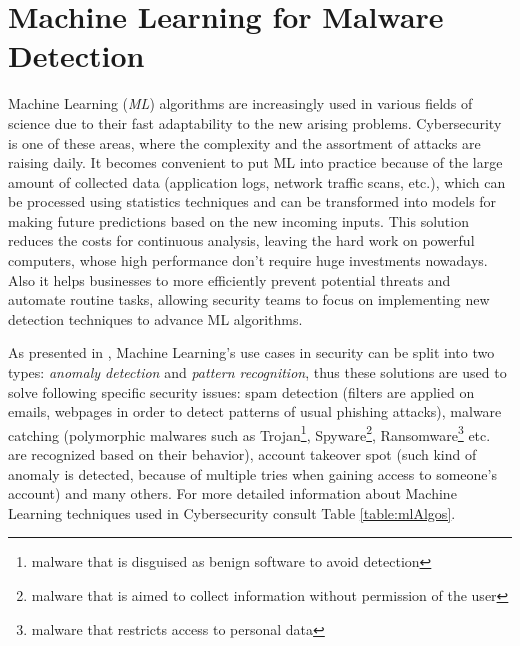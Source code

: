 \section{Machine Learning for Malware Detection}
\label{section:mlForMalware}
Machine Learning (\textit{ML}) algorithms are increasingly used in various fields of science due to their fast adaptability to the new arising problems. Cybersecurity is one of these areas, where the complexity and the assortment of attacks are raising daily. It becomes convenient to put ML into practice because of the large amount of collected data (application logs, network traffic scans, etc.), which can be processed using statistics techniques and can be transformed into models for making future predictions based on the new incoming inputs. This solution reduces the costs for continuous analysis, leaving the hard work on powerful computers, whose high performance don't require huge investments nowadays. Also it helps businesses to more efficiently prevent potential threats and automate routine tasks, allowing security teams to focus on implementing new detection techniques to advance ML algorithms. \par 
As presented in \cite{mlsec}, Machine Learning's use cases in security can be split into two types: \textit{anomaly detection} and \textit{pattern recognition}, thus these solutions are used to solve following specific security issues: spam detection (filters are applied on emails, webpages in order to detect patterns of usual phishing attacks), malware catching (polymorphic malwares such as Trojan\footnote{malware that is disguised as benign software to avoid detection}, Spyware\footnote{malware that is aimed to collect information without permission of the user}, Ransomware\footnote{malware that restricts access to personal data} etc. are recognized based on their behavior), account takeover spot (such kind of anomaly is detected, because of multiple tries when gaining access to someone's account) and many others. For more detailed information about Machine Learning techniques used in Cybersecurity consult Table \ref{table:mlAlgos}.

